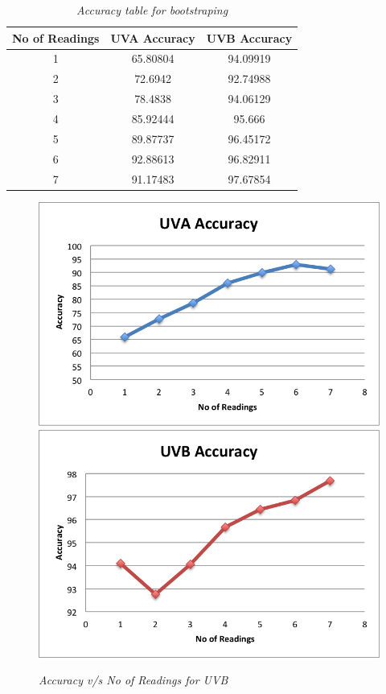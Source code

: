 \documentclass[12pt,fullpage,doublespace]{article}
\begin{document}
\newpage
\begin{table}
\centering
\begin{tabular}{|c|c|c|}
\hline
No of Readings & UVA Accuracy & UVB Accuracy \\
\hline 
1 & 65.80804 & 94.09919\\
\hline
2 & 72.6942 & 92.74988\\
\hline
3 & 78.4838 & 94.06129\\
\hline
4 & 85.92444 & 95.666\\
\hline
5 & 89.87737 & 96.45172\\
\hline
6 & 92.88613 & 96.82911\\
\hline
7 & 91.17483 & 97.67854\\
\hline
\end{tabular}
\caption{\small \sl Accuracy table for bootstraping}
\end{table}


\begin{figure}
\begin{center}
\includegraphics[scale=0.5]{segment7uva.png}
\includegraphics[scale=0.5]{segment7uvb.png}
\caption{\small \sl Accuracy v/s No of Readings for UVB}
\label{fig:lessReadings}
\end{center}
\end{figure}
\end{document}
